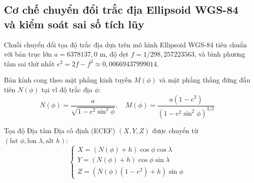 \subsection{Cơ chế chuyển đổi trắc địa Ellipsoid WGS-84 và kiểm soát sai số tích lũy}

\hspace{0.5cm} Chuỗi chuyển đổi tọa độ trắc địa dựa trên mô hình Ellipsoid WGS-84 tiêu chuẩn với bán trục lớn $a = 6378137{,}0$ m, độ dẹt $f = 1/298{,}257223563$, và bình phương tâm sai thứ nhất $e^2 = 2f - f^2 \approx 0{,}00669437999014$.

Bán kính cong theo mặt phẳng kinh tuyến $M(\phi)$ và mặt phẳng thẳng đứng đầu tiên $N(\phi)$ tại vĩ độ trắc địa $\phi$:
\begin{equation}
N(\phi) = \frac{a}{\sqrt{1 - e^2 \sin^2\phi}}, \quad M(\phi) = \frac{a(1 - e^2)}{(1 - e^2 \sin^2\phi)^{3/2}}
\label{eq:geodetic-radii}
\end{equation}

Tọa độ Địa tâm Địa cố định (ECEF) $(X, Y, Z)$ được chuyển từ $( \text{lat } \phi, \text{lon } \lambda, \text{alt } h )$:
\begin{equation}
\begin{cases}
X = (N(\phi) + h) \cos\phi \cos\lambda \\
Y = (N(\phi) + h) \cos\phi \sin\lambda \\
Z = (N(\phi)(1 - e^2) + h) \sin\phi
\end{cases}
\label{eq:lla-to-ecef-full}
\end{equation}

\begin{table}[H]
\centering
\caption{Kiểm định độ chính xác khứ hồi và sai số trôi tích lũy qua 10.000 chu kỳ lặp}
\label{tab:geodetic-roundtrip-verification}
\end{table}

